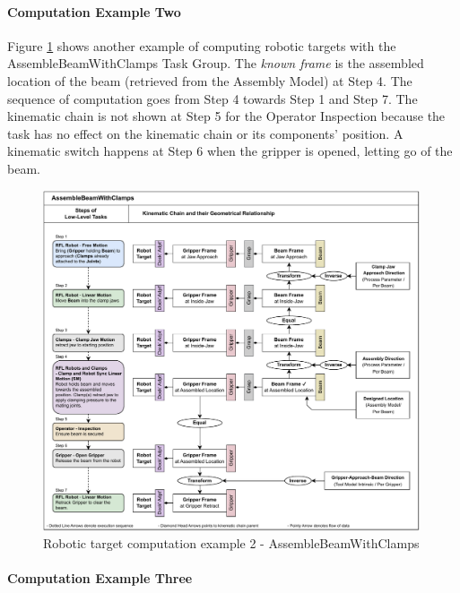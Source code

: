 \FloatBarrier

\paragraph{Computation Example Two}

Figure \ref{fig:chain-example-2} shows another example of computing robotic targets with the AssembleBeamWithClamps Task Group. The \textit{known frame} is the assembled location of the beam (retrieved from the Assembly Model) at Step 4. The sequence of computation goes from Step 4 towards Step 1 and Step 7. The kinematic chain is not shown at Step 5 for the Operator Inspection because the task has no effect on the kinematic chain or its components’ position. A kinematic switch happens at Step 6 when the gripper is opened, letting go of the beam.

\begin{figure}[!h]
    \centering
    \includegraphics[width=0.99\textwidth]{images/6a/assemble-beam-with-clamps.pdf}
    \caption{Robotic target computation example 2 - AssembleBeamWithClamps}
    \label{fig:chain-example-2}
\end{figure}

\FloatBarrier

\paragraph{Computation Example Three}

